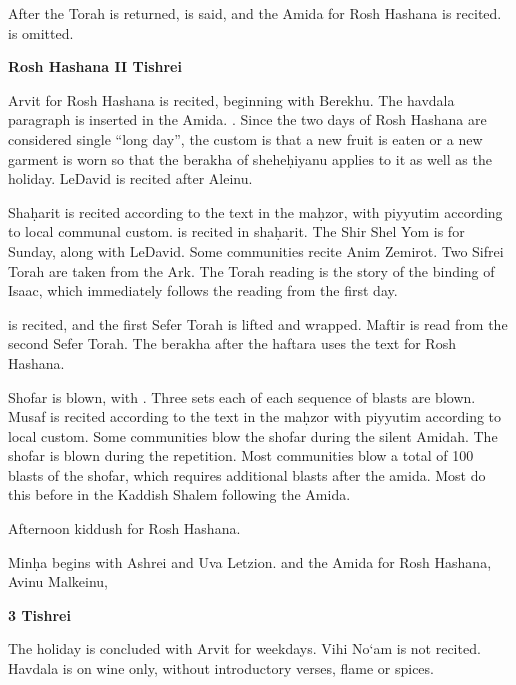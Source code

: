 {	\leinHaazinuweekday
	
	After the Torah is returned, \halfkad is said, and the Amida for Rosh Hashana is recited. \space is omitted.
	
	\textbf{Rosh Hashana II \textendash{} Tishrei}
	
	Arvit for Rosh Hashana is recited, beginning with Berekhu.  The havdala paragraph is inserted in the Amida.  \yakenhaz . Since the two days of Rosh Hashana are considered single ``long day'', the custom is that a new fruit is eaten or a new garment is worn so that the berakha of shehe\d{h}iyanu applies to it as well as the holiday. LeDavid is recited after Aleinu.
	
	Sha\d{h}arit is recited according to the text in the ma\d{h}zor, with piyyutim according to local communal custom.  is recited in sha\d{h}arit. The Shir Shel Yom is for Sunday, along with LeDavid.  Some communities recite Anim Zemirot.  Two Sifrei Torah are taken from the Ark.  The Torah reading is the story of the binding of Isaac, which immediately follows the reading from the first day.
	
	\leinRoshHashanaII
	
	\halfkad is recited, and the first Sefer Torah is lifted and wrapped. Maftir is read from the second Sefer Torah. \haftRoshHashanaII The berakha after the haftara uses the text for Rosh Hashana.
	
	Shofar is blown, with . Three sets each of each sequence of blasts are blown.  Musaf is recited according to the text in the ma\d{h}zor with piyyutim according to local custom. Some communities blow the shofar during the silent Amidah.  The shofar is blown during the repetition.  Most communities blow a total of 100 blasts of the shofar, which requires additional blasts after the amida.  Most do this before  in the Kaddish Shalem following the Amida.
	
	Afternoon kiddush for Rosh Hashana.
	
	Min\d{h}a begins with Ashrei and Uva Letzion. \halfkad and the Amida for Rosh Hashana, Avinu Malkeinu, \fullkad
	
	\textbf{3 Tishrei}
	
	The holiday is concluded with Arvit for weekdays. Vihi No`am is not recited. Havdala is on wine only, without introductory verses, flame or spices.
}

